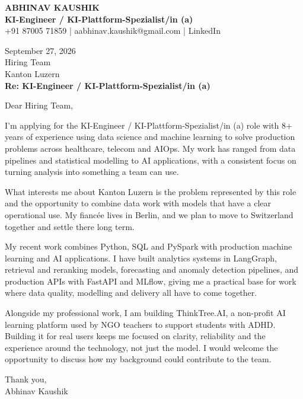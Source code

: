 \documentclass[10pt,a4paper]{article}
\begin{document}
\begin{center}
{\Large\bfseries ABHINAV KAUSHIK}\\[2pt]
{\bfseries KI-Engineer / KI-Plattform-Spezialist/in (a)}\\[2pt]
+91 87005 71859 \quad | \quad aabhinav.kaushik@gmail.com \quad | \quad LinkedIn
\end{center}
\vspace{8pt}
September 27, 2026\\[6pt]
Hiring Team\\
Kanton Luzern\\[4pt]
\textbf{Re: KI-Engineer / KI-Plattform-Spezialist/in (a)}

Dear Hiring Team,

I’m applying for the KI-Engineer / KI-Plattform-Spezialist/in (a) role with 8+ years of experience using data science and machine learning to solve production problems across healthcare, telecom and AIOps. My work has ranged from data pipelines and statistical modelling to AI applications, with a consistent focus on turning analysis into something a team can use.

What interests me about Kanton Luzern is the problem represented by this role and the opportunity to combine data work with models that have a clear operational use. My fiancée lives in Berlin, and we plan to move to Switzerland together and settle there long term.

My recent work combines Python, SQL and PySpark with production machine learning and AI applications. I have built analytics systems in LangGraph, retrieval and reranking models, forecasting and anomaly detection pipelines, and production APIs with FastAPI and MLflow, giving me a practical base for work where data quality, modelling and delivery all have to come together.

Alongside my professional work, I am building ThinkTree.AI, a non-profit AI learning platform used by NGO teachers to support students with ADHD. Building it for real users keeps me focused on clarity, reliability and the experience around the technology, not just the model. I would welcome the opportunity to discuss how my background could contribute to the team.

Thank you,\\
Abhinav Kaushik
\end{document}
